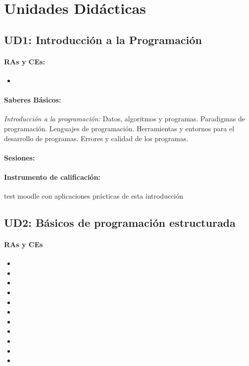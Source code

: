 \section{Unidades Didácticas}
\subsection{UD1: Introducción a la Programación}

	\paragraph{RAs y CEs:}
	\begin{itemize}[itemsep=0.1em, topsep=0.1em]
		\item\RAUNOa
	\end{itemize}

	\paragraph{Saberes Básicos:} \emph{Introducción a la programación:}
		Datos, algoritmos y programas.
		Paradigmas de programación.
		Lenguajes de programación.
		Herramientas y entornos para el desarrollo de programas.
		Errores y calidad de los programas.



	\paragraph{Sesiones:} 

	\paragraph{Instrumento de calificación:} 
		test moodle con aplicaciones prácticas de esta introducción

\newpage
\subsection{UD2: Básicos de programación estructurada}

	\paragraph{RAs y CEs} 
	\begin{itemize}[itemsep=0.1em, topsep=0.1em]
		\item\RAUNOb
		\item\RAUNOc
		\item\RAUNOd
		\item\RAUNOe
		\item\RAUNOf
		\item\RAUNOg
		\item\RAUNOh
		\item\RAUNOi
		\item\RACINCOa
		\item\RACINCOb
		\item\RACINCOc
	\end{itemize}


